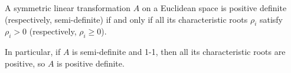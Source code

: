 A symmetric linear transformation $A$ on a Euclidean space is positive definite (respectively, semi-definite) if and only if all its characteristic roots $\rho_i$ satisfy $\rho_i > 0$ (respectively, $\rho_i \geq 0$).

In particular, if $A$ is semi-definite and 1-1, then all its characteristic roots are positive, so $A$ is positive definite.
